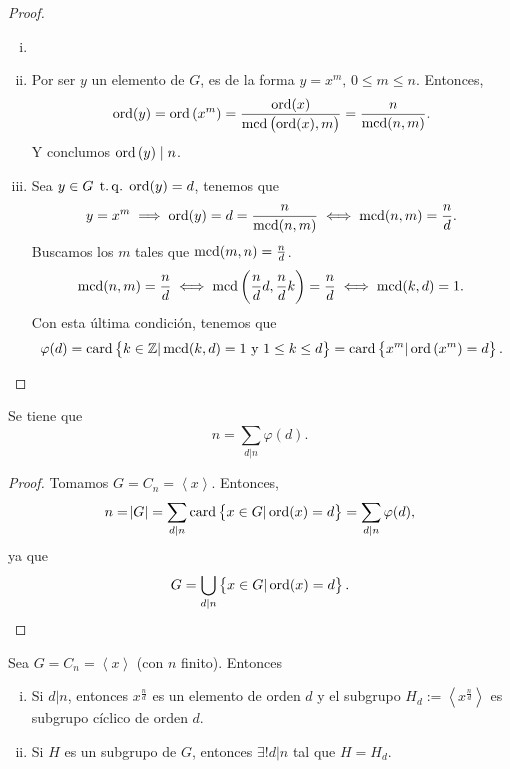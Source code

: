 \begin{proof}
    \begin{enumerate}[i)]
        \item[]
        \item Por ser $y$ un elemento de $G$, es de la forma $y=x^m,\,0\leq m\leq n$. Entonces,
                \[
                    \operatorname{ord}(y) = \operatorname{ord}\left( x^m \right) = \frac{\operatorname{ord}(x)}{\operatorname{mcd}\left(\operatorname{ord}(x), m \right)} = \frac{n}{\operatorname{mcd}(n, m)}.
                \]
            Y conclumos $\operatorname{ord}\left( y\right) \mid n$.
        \item Sea $y \in G \operatorname{\;t.q.\;} \operatorname{ord}(y) = d$, tenemos que
                \[
                    y = x^m \implies \operatorname{ord}(y) = d = \frac{n}{\operatorname{mcd}(n, m)} \iff \operatorname{mcd}(n, m) = \frac{n}{d}.
                \]
                Buscamos los $m$ tales que $\operatorname{mcd}(m, n) = \frac{n}{d}$.
                \[
                    \operatorname{mcd}(n, m) = \frac{n}{d} \iff \operatorname{mcd}\left( \frac{n}{d}d, \frac{n}{d}k \right) = \frac{n}{d}
                    \iff \operatorname{mcd}(k, d) = 1.
                \]
                Con esta última condición, tenemos que
                \[
                    \varphi(d) = \operatorname{card} \left\{ k \in \mathbb{Z} \vert \operatorname{mcd}(k, d) = 1 \text{ y } 1 \leq k \leq d\right\}
                    = \operatorname{card} \left\{ x^m \vert \operatorname{ord}\left( x^m \right) = d\right\}.
                \]
    \end{enumerate}
\end{proof}

\begin{col}
    Se tiene que
    \[
        n = \sum_{d \vert n} \varphi(d).
    \]
\end{col}

\begin{proof}
    Tomamos $G = C_n = \left< x \right>$. Entonces,
    \[
        n = \abs{G} = \sum_{d \vert n} \operatorname{card} \left\{ x \in G \vert \operatorname{ord}(x) =d \right\} = \sum_{d \vert n} \varphi(d),
    \]
    ya que
    \[
        G = \bigcup_{d \vert n} \left\{x \in G \vert \operatorname{ord}(x) = d\right\}.
    \]
\end{proof}

\begin{prop}
    Sea $G = C_n = \left< x \right>$ (con $n$ finito). Entonces
    \begin{enumerate}[i)]
        \item Si $d \vert n$, entonces $x^{\frac{n}{d}}$ es un elemento de orden $d$
            y el subgrupo $H_d := \left< x^{\frac{n}{d}} \right>$ es subgrupo cíclico de orden $d$.
        \item Si $H$ es un subgrupo de $G$, entonces $\exists! d \vert n$ tal que $H = H_d$.
    \end{enumerate}
\end{prop}

